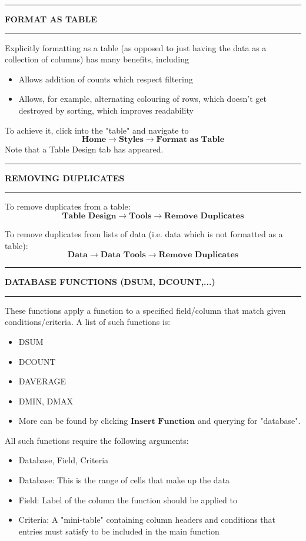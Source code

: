 \documentclass[8pt]{extarticle}
\newcommand{\heading}[1]{%
    \noindent
    \rule{\linewidth}{0.4pt}
    \begin{center}
        \vspace{-1ex}
        \textbf{#1}        
        \vspace{-2.5ex}
    \end{center}
    \rule{\linewidth}{0.4pt}
}
\begin{document}
\begin{multicols}{3}
\heading{FORMAT AS TABLE}

Explicitly formatting as a table (as opposed to just having the data as a collection of columns) has many benefits, including
\begin{itemize}
    \item Allows addition of counts which respect filtering
    \item Allows, for example, alternating colouring of rows, which doesn't get destroyed by sorting, which improves readability
\end{itemize}
To achieve it, click into the "table" and navigate to 
\[ \textbf{Home} \rightarrow \textbf{Styles} \rightarrow \textbf{Format as Table}\]
Note that a Table Design tab has appeared.

\heading{REMOVING DUPLICATES}

To remove duplicates from a table:
\[ \textbf{Table Design} \rightarrow \textbf{Tools} \rightarrow \textbf{Remove Duplicates}\]

To remove duplicates from lists of data (i.e. data which is not formatted as a table):
\[ \textbf{Data} \rightarrow \textbf{Data Tools} \rightarrow \textbf{Remove Duplicates} \]

\columnbreak
\heading{DATABASE FUNCTIONS (DSUM, DCOUNT,...)}

These functions apply a function to a specified field/column that match given conditions/criteria. A list of such functions is: 

\begin{itemize}
    \item DSUM
    \item DCOUNT
    \item DAVERAGE
    \item DMIN, DMAX
    \item More can be found by clicking $\textbf{Insert Function}$ and querying for "database".
\end{itemize}

All such functions require the following arguments:

\begin{itemize}
    \item Database, Field, Criteria
    \item Database: This is the range of cells that make up the data
    \item Field: Label of the column the function should be applied to
    \item Criteria: A "mini-table" containing column headers and conditions that entries must satisfy to be included in the main function
\end{itemize}


\end{multicols}
\end{document}
